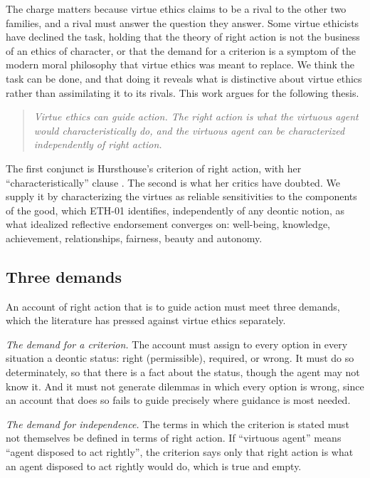\documentclass{situationist-preprint}
\begin{document}
The charge matters because virtue ethics claims to be a rival to the other two families, and a rival must answer the question they answer. Some virtue ethicists have declined the task, holding that the theory of right action is not the business of an ethics of character, or that the demand for a criterion is a symptom of the modern moral philosophy that virtue ethics was meant to replace. We think the task can be done, and that doing it reveals what is distinctive about virtue ethics rather than assimilating it to its rivals. This work argues for the following thesis.

\begin{quote}
\emph{Virtue ethics can guide action. The right action is what the virtuous agent would characteristically do, and the virtuous agent can be characterized independently of right action.}
\end{quote}

The first conjunct is Hursthouse's criterion of right action, with her \enquote{characteristically} clause \citep[28]{Hursthouse1999}. The second is what her critics have doubted. We supply it by characterizing the virtues as reliable sensitivities to the components of the good, which ETH-01 identifies, independently of any deontic notion, as what idealized reflective endorsement converges on: well-being, knowledge, achievement, relationships, fairness, beauty and autonomy.

\subsection{Three demands}

An account of right action that is to guide action must meet three demands, which the literature has pressed against virtue ethics separately.

\emph{The demand for a criterion.} The account must assign to every option in every situation a deontic status: right (permissible), required, or wrong. It must do so determinately, so that there is a fact about the status, though the agent may not know it. And it must not generate dilemmas in which every option is wrong, since an account that does so fails to guide precisely where guidance is most needed.

\emph{The demand for independence.} The terms in which the criterion is stated must not themselves be defined in terms of right action. If \enquote{virtuous agent} means \enquote{agent disposed to act rightly}, the criterion says only that right action is what an agent disposed to act rightly would do, which is true and empty.
\end{document}
